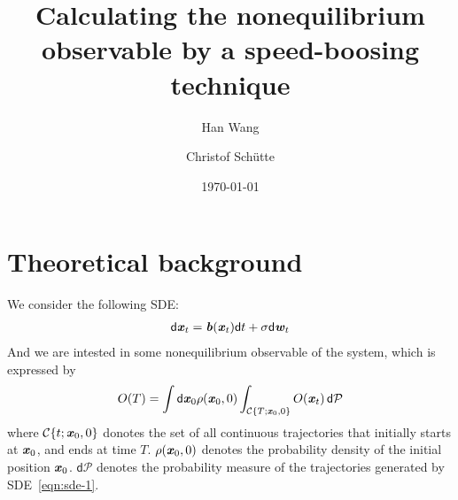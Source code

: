 \documentclass[aip,jcp,a4paper,reprint,onecolumn]{revtex4-1}
\newcommand{\vect}[1]{\textbf{\textit{#1}}}
\newcommand{\dd}{\textsf{d}}
\newcommand{\mc}{\mathcal C}
\newcommand{\pathmeas}{\mathcal P}
\begin{document}
\title{Calculating the nonequilibrium observable by a speed-boosing
technique}
\author{Han Wang}
\author{Christof Sch\"utte}

\date{\today}

\begin{abstract}
\end{abstract}

\maketitle



\section{Theoretical background}

We consider the following SDE:
\begin{align}\label{eqn:sde-1}
  \dd \vect x_t = \vect b(\vect x_t) \dd t + \sigma\dd \vect w_t
\end{align}
And we are intested in some nonequilibrium observable of the system,
which is expressed by
\begin{align*}
  O(T) = \int \dd\vect x_0 \rho(\vect x_0, 0)
  \int_{\mc\{T; \vect x_0, 0\}} 
  O(\vect x_t)\,\dd\pathmeas
\end{align*}
where $\mc\{t; \vect x_0, 0\}$ donotes the set of all continuous
trajectories that initially starts at $\vect x_0$, and ends at time $T$.
$\rho(\vect x_0, 0)$ denotes the probability density of the initial position
$\vect x_0$. $\dd \pathmeas$ denotes the probability measure of the trajectories
generated by SDE~\eqref{eqn:sde-1}.
\end{document}
